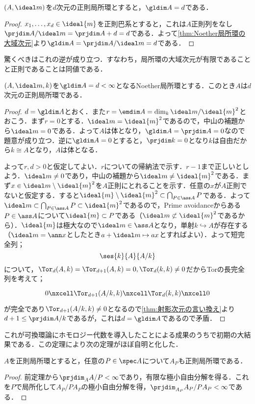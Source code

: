 \begin{thm}
	$(A,\ideal m)$を$d$次元の正則局所環とすると，$\gldim A=d$である．
\end{thm}

\begin{proof}
	$x_1,\dots,x_d\in\ideal{m}$を正則巴系とすると，これは$A$正則列をなし$\prjdim A/\ideal m=\prjdim A+d=d$である．よって\ref{thm:Noether局所環の大域次元}より$\gldim A=\prjdim A/\ideal m=d$である．
\end{proof}

驚くべきはこれの逆が成り立つ．すなわち，局所環の大域次元が有限であることと正則であることは同値である．

\begin{thm}[Serre]
	$(A,\ideal m,k)$を$\gldim A=d<\infty$となるNoether局所環とする．このとき$A$は$d$次元の正則局所環である．
\end{thm}

\begin{proof}
	$d=\gldim A$とおく．また$r=\emdim A=\dim_k\ideal m/\ideal{m}^2$とおこう．まず$r=0$とする．$\ideal m=\ideal{m}^2$であるので，中山の補題から$\ideal m=0$である．よって$A$は体となり，$\gldim A=\prjdim A=0$なので題意が成り立つ．逆に$\gldim A=0$とすると，$\prjdim k=0$となり$k$は自由だから$k\cong A$となり，$A$は体となる．
	
	よって$r,d>0$と仮定してよい．$r$についての帰納法で示す．$r-1$まで正しいとしよう．$\ideal m\neq0$であり，中山の補題から$\ideal m\neq\ideal{m}^2$である．まず$x\in\ideal m\setminus\ideal{m}^2$を$A$正則にとれることを示す．任意の$x$が$A$正則でないと仮定する．すると$\ideal{m}\setminus\ideal{m}^2\subset\bigcap_{P\in\ass A}P$である．よって$\ideal m\subset\bigcap_{P\in\ass A}P\subset\ideal{m}^2$であるので，Prime avoidanceからある$P\in\ass A$について$\ideal{m}\subset P$である（$\ideal m\not\subset\ideal{m}^2$であるから）．$\ideal{m}$は極大なので$\ideal m\in\ass A$となり，単射$k\hookrightarrow A$が存在する（$\ideal m=\ann x$としたとき$a+\ideal m\mapsto ax$とすればよい）．よって短完全列；
	\[\ses{k}{A}{A/k}\]
	について，$\Tor_d(A,k)=\Tor_{d+1}(A,k)=0,\Tor_d(k,k)\neq0$だからTorの長完全列を考えて；
	\[\begin{tikzcd}
		0\nxcell\Tor_{d+1}(A/k,k)\nxcell\Tor_d(k,k)\nxcell0
	\end{tikzcd}\]
	が完全であり$\Tor_{d+1}(A/k,k)\neq0$となるので\ref{thm:射影次元の言い換え}より$d+1\leq\prjdim A/k$であるが，これは$d=\gldim A$であるので矛盾．
\end{proof}

これが可換環論にホモロジー代数を導入したことによる成果のうちで初期の大結果である．この定理により次の定理がほぼ自明と化した．
\begin{thm}[Serreの定理]\label{thm:Serreの定理}
	$A$を正則局所環とすると，任意の$P\in\spec A$について$A_P$も正則局所環である．
\end{thm}

\begin{proof}
	前定理から$\prjdim_A A/P<\infty$であり，有限な極小自由分解を得る．これを$P$で局所化して$A_P/PA_P$の極小自由分解を得，$\prjdim_{A_P} A_P/PA_P<\infty$である．
\end{proof}
